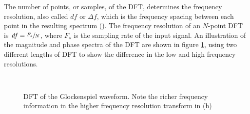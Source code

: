 \documentclass[report.tex]{subfiles}
\begin{document}
The number of points, or samples, of the DFT, determines the frequency resolution, also called $\mathit{df}$ or $\mathit{\Delta f}$, which is the frequency spacing between each point in the resulting spectrum (\cite{discretebook}). The frequency resolution of an $N$-point DFT is $\mathit{df} = \sfrac{F_{s}}{N}$, where $F_{s}$ is the sampling rate of the input signal. An illustration of the magnitude and phase spectra of the DFT are shown in figure \ref{fig:glockdft}, using two different lengths of DFT to show the difference in the low and high frequency resolutions.

\begin{figure}[ht]
	\centering
	\\
	\caption{DFT of the Glockenspiel waveform. Note the richer frequency information in the higher frequency resolution transform in (b)}
	\label{fig:glockdft}
\end{figure}
\end{document}
